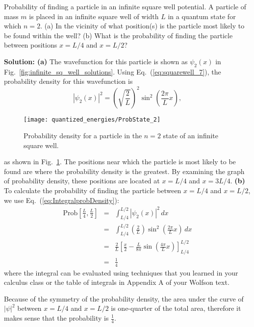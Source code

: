 \begin{example}{Probability of finding a particle in an infinite square well potential.}
A particle of mass $m$ is placed in an infinite square well of width
$L$ in a quantum state for which $n = 2$. (a) In the vicinity of what position(s) is
the particle most likely to be found within the well?  (b) What is the
probability of finding the particle between positions $x = L/4$ and $x
= L/2$?

{\bf Solution: (a)} The wavefunction for this particle is shown as
$\psi_2(x)$ in Fig.~\ref{fig:infinite_sq_well_solutions}.  Using
Eq.~(\ref{eq:squarewell_7}), the probability density for this
wavefunction is
\begin{equation}
|\psi_2(x)|^2 = \left(\sqrt{\frac{2}{L}} \right)^2 
                      \sin^2\left(\frac{2 \pi}{L}x\right) ,
\end{equation}

\begin{figure}[!tb]
\begin{center}
\texttt{[image: quantized\_energies/ProbState\_2]}
\end{center}
\caption{Probability density for a particle in the $n=2$ state of an infinite square well.}
\label{fig:ProbState_2}
\end{figure}

\noindent as shown in Fig.~\ref{fig:ProbState_2}. The positions
near which the particle is most likely to be found are where the
probability density is the greatest. By examining the graph of
probability density, these positions are located at $x = L/4$ and $x =
3L/4$.  {\bf (b)} To calculate the probability of finding the particle
between $x = L/4$ and $x = L/2$, we use 
Eq.~(\ref{eq:IntegralprobDensity}):
\begin{eqnarray}
\mbox{Prob}\left[\frac{L}{4}, \frac{L}{2}\right] 
   &=& \int_{L/4}^{L/2} |\psi_2(x)|^2\, dx \nonumber \\
   &=& \int_{L/4}^{L/2} \left(\frac{2}{L}\right) 
              \sin^2\left(\frac{2 \pi}{L}x\right)\, dx \nonumber \\
   &=& \frac{2}{L} \left[\frac{x}{2} 
       - \frac{L}{8 \pi}\sin \left(\frac{4 \pi}{L}x\right) \right]_{L/4}^{L/2}
           \nonumber \\ 
   &=&  \frac{1}{4} 
\end{eqnarray}
\noindent where the integral can be evaluated using techniques that you
learned in your calculus class or the table of integrals in Appendix A of
your Wolfson text.

Because of the symmetry of the probability density, the area under the
curve of $\left|\psi\right|^2$ between $x = L/4$ and $x = L/2$ is
one-quarter of the total area, therefore it makes sense that the
probability is $\frac{1}{4}$.
\end{example}


